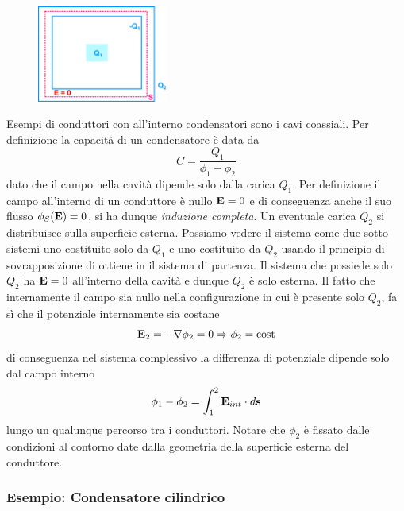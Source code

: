 \begin{figure}
  \centering
  \includegraphics[width=0.38\textwidth]{images/cond_cons}
\end{figure}
Esempi di conduttori con all'interno condensatori sono i cavi coassiali. Per definizione la capacit\`a di un condensatore \`e data da 
\begin{equation*}
	C = \frac{Q_1}{\phi_1 - \phi_2}
\end{equation*}
dato che il campo nella cavit\`a dipende solo dalla carica $Q_1$. Per definizione il campo all'interno di un conduttore \`e nullo $\bold{E} = 0$ e di conseguenza anche il suo flusso $\phi_{S}(\bold{E}) = 0$, si ha dunque \textit{induzione completa}. Un eventuale carica $Q_2$ si distribuisce sulla superficie esterna. Possiamo vedere il sistema come due sotto sistemi uno costituito solo da $Q_1$ e uno costituito da $Q_2$ usando il principio di sovrapposizione di ottiene in il sistema di partenza. Il sistema che possiede solo $Q_2$ ha $\bold{E} =0$ all'interno della cavit\`a e dunque $Q_2$ \`e solo esterna. Il fatto che internamente il campo sia nullo nella configurazione in cui \`e presente solo $Q_2$, fa s\`i che il potenziale internamente sia costane 
\begin{equation*}
	\bold{E}_2 = - \nabla\phi_2 = 0 \Rightarrow \phi_2 = \text{cost}
\end{equation*}
di conseguenza nel sistema complessivo la differenza di potenziale dipende solo dal campo interno
\begin{equation*}
	\phi_{1} - \phi_2 = \int_{1}^{2} \bold{E}_{int} \cdot d\bold{s}
\end{equation*}
lungo un qualunque percorso tra i conduttori. Notare che $\phi_{2}$ \`e fissato dalle condizioni al contorno date dalla geometria della superficie esterna del conduttore.

\subsubsection{Esempio: Condensatore cilindrico}

